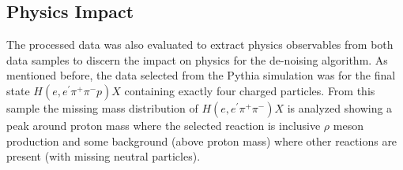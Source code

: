 \subsection{Physics Impact}

The processed data was also evaluated to extract physics observables from both data samples to discern the impact on physics for the de-noising algorithm. As mentioned before, the data selected from the Pythia simulation was for the final state $H(e,e^\prime\pi^+\pi^-p)X$ containing exactly four charged particles. From this sample the missing mass distribution of $H(e,e^\prime\pi^+\pi^-)X$ is analyzed showing a peak around proton mass where the selected reaction is inclusive $\rho$ meson production and some background (above proton mass) where other reactions  are present (with missing neutral particles).


